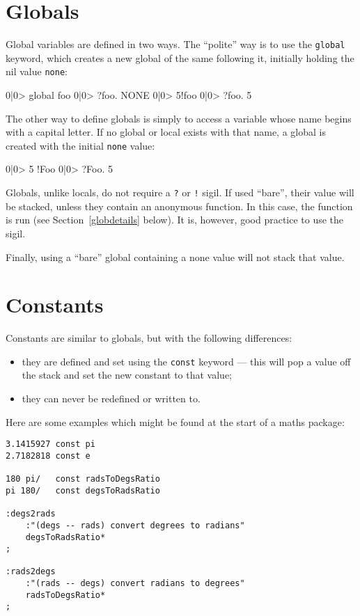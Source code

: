 \section{Globals}
Global variables are defined in two ways. The ``polite'' way is to use the 
\texttt{global} keyword, which creates a new global of the same following
it, initially holding the nil value \texttt{none}:
\begin{v}
0|0> global foo
0|0> ?foo.
NONE
0|0> 5!foo
0|0> ?foo.
5
\end{v}
The other way to define globals is simply to access a variable whose
name begins with a capital letter. If no global or local exists with that
name, a global is created with the initial \texttt{none} value:
\begin{v}
0|0> 5 !Foo
0|0> ?Foo.
5
\end{v}
Globals, unlike locals, do not require a \texttt{?} or \texttt{!} sigil.
If used ``bare'', their value will be stacked, unless they contain
an anonymous function. In this case, the function is run (see
Section~\ref{globdetails} below). It is, however, good practice to use
the sigil.

Finally, using a ``bare'' global containing a none value will not stack
that value.

\section{Constants}
Constants are similar to globals, but with the following differences:
\begin{itemize}
\item they are defined and set using the \texttt{const} keyword ---
this will pop a value off the stack and set the new constant to that value;
\item they can never be redefined or written to.
\end{itemize}
Here are some examples which might be found at the start of a maths
package:
\begin{lstlisting}
3.1415927 const pi
2.7182818 const e

180 pi/   const radsToDegsRatio
pi 180/   const degsToRadsRatio

:degs2rads
    :"(degs -- rads) convert degrees to radians"
    degsToRadsRatio*
;

:rads2degs
    :"(rads -- degs) convert radians to degrees"
    radsToDegsRatio*
;
\end{lstlisting}


